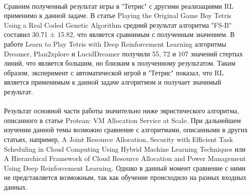 \documentclass{article}
\begin{document}
~\\
Сравним полученный результат игры в "Тетрис" с другими реализациями RL применимо к данной задаче. В статье Playing the Original Game Boy Tetris Using a Real Coded Genetic Algorithm\cite{litlink7} средний результат алгоритма "FS-B" составил 30.71 ± 15.82, что является сравнимым с полученным значением. В работе Learn to Play Tetris with Deep Reinforcement Learning\cite{litlink20} алгоритмы Dreamer, Plan2xplore и LucidDreamer получили 55, 72 и 107 значений стертых линий, что является большим, но близким к полученному результатом. Таким образом, эксперимент с автоматической игрой в "Тетрис" показал, что RL является применимым к данной задаче алгоритмом и получает значимый результат.\\
~\\
Результат основной части работы значительно ниже эвристического алгоритма, описанного в статье Protean: VM Allocation Service at Scale\cite{litlink21}. При дальнейшем изучении данной темы возможно сравнение с алгоритмами, описанными в других статьях, например, A Joint Resource Allocation, Security with Efficient Task Scheduling in Cloud Computing Using Hybrid Machine Learning Techniques\cite{litlink23} или A Hierarchical Framework of Cloud Resource Allocation and Power Management Using Deep Reinforcement Learning\cite{litlink24}. Однако в данный момент сравнение с ними не представляется возможным, так как обучение происходило на разных входных данных.
\newpage
\end{document}
